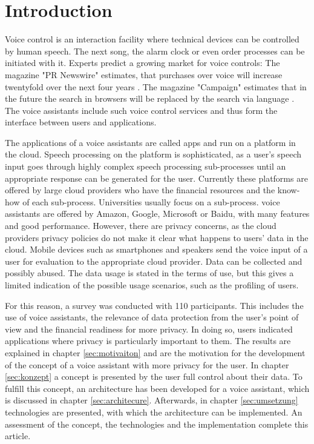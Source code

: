 \section{Introduction}
Voice control is an interaction facility where technical devices can be controlled by human speech. The next song, the alarm clock or even order processes can be initiated with it. Experts predict a growing market for voice controls: The magazine "PR Newswire" estimates, that purchases over voice will increase twentyfold over the next four years \cite{prNewswire}. The magazine "Campaign" estimates that in the future the search in browsers will be replaced by the search via language \cite{Campaign}. The voice assistants include such voice control services and thus form the interface between users and applications.

The applications of a voice assistants are called apps and run on a platform in the cloud. Speech processing on the platform is sophisticated, as a user's speech input goes through highly complex speech processing sub-processes until an appropriate response can be generated for the user. Currently these platforms are offered by large cloud providers who have the financial resources and the know-how of each sub-process. Universities usually focus on a sub-process. voice assistants are offered by Amazon, Google, Microsoft or Baidu, with many features and good performance. However, there are privacy concerns, as the cloud providers privacy policies do not make it clear what happens to users' data in the cloud. Mobile devices such as smartphones and speakers send the voice input of a user for evaluation to the appropriate cloud provider. Data can be collected and possibly abused. The data usage is stated in the terms of use, but this gives a limited indication of the possible usage scenarios, such as the profiling of users.

For this reason, a survey was conducted with 110 participants. This includes the use of voice assistants, the relevance of data protection from the user's point of view and the financial readiness for more privacy. In doing so, users indicated applications where privacy is particularly important to them. The results are explained in chapter \ref{sec:motivaiton} and are the motivation for the development of the concept of a voice assistant with more privacy for the user. In chapter \ref{sec:konzept} a concept is presented by the user full control about their data. To fulfill this concept, an architecture has been developed for a voice assistant, which is discussed in chapter \ref{sec:architecure}. Afterwards, in chapter \ref{sec:umsetzung} technologies are presented, with which the architecture can be implemented. An assessment of the concept, the technologies and the implementation complete this article. \newline

